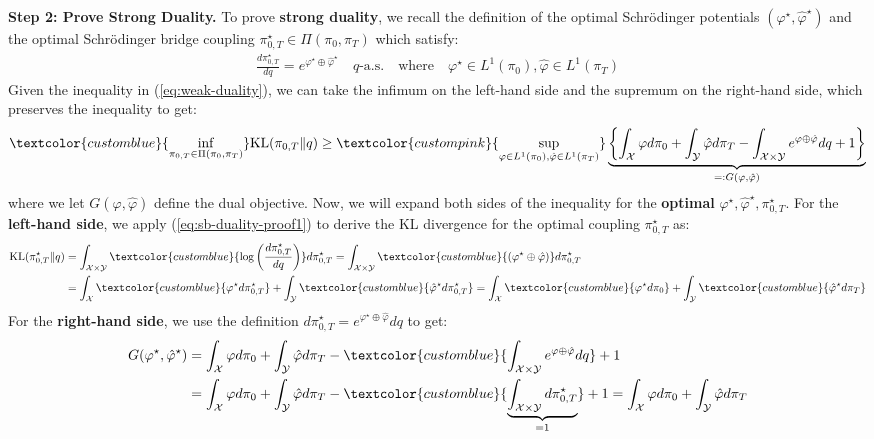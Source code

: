 \documentclass{article}
\newcommand{\boldtext}[1]{\textbf{\textcolor{MyGreen}{#1}}}
\newcommand{\bluetext}[1]{\textcolor{customblue}{#1}}
\newcommand{\pinktext}[1]{\textcolor{custompink}{#1}}
\begin{document}
\textbf{Step 2: Prove Strong Duality. }
To prove \boldtext{strong duality}, we recall the definition of the optimal Schrödinger potentials $(\varphi^\star, \hat{\varphi}^\star)$ and the optimal Schrödinger bridge coupling $\pi^\star_{0,T}\in \Pi(\pi_0, \pi_T)$ which satisfy:
\begin{align}
    \frac{d\pi^\star_{0,T}}{dq}=e^{\varphi^\star \oplus \hat{\varphi}^\star}\quad q\text{-a.s.}\quad \text{where}\quad \varphi^\star\in L^1(\pi_0), \hat{\varphi}\in L^1(\pi_T)\label{eq:sb-duality-proof1}
\end{align}
Given the inequality in (\ref{eq:weak-duality}), we can take the infimum on the left-hand side and the supremum on the right-hand side, which preserves the inequality to get:
\begin{align}
    \bluetext{\inf_{\pi_{0,T}\in\Pi(\pi_0, \pi_T)}}\text{KL}(\pi_{0,T}\|q)\geq\pinktext{\sup_{\varphi\in L^1(\pi_0), \hat{\varphi}\in L^1(\pi_T)}}\underbrace{\left\{\int_{\mathcal{X}}\varphi d\pi_0+\int_{\mathcal{Y}}\hat{\varphi}d\pi_T-\int_{\mathcal{X}\times \mathcal{Y}}e^{\varphi\oplus\hat{\varphi}}dq+1\right\}}_{=:G(\varphi, \hat{\varphi})}
\end{align}
where we let $G(\varphi, \hat{\varphi})$ define the dual objective. Now, we will expand both sides of the inequality for the \textbf{optimal} $\varphi^\star, \hat{\varphi}^\star, \pi^\star_{0,T}$. For the \textbf{left-hand side}, we apply (\ref{eq:sb-duality-proof1}) to derive the KL divergence for the optimal coupling $\pi^\star_{0,T}$ as: 
\begin{align}
    \text{KL}(\pi^\star_{0,T}\|q)&=\int_{\mathcal{X}\times \mathcal{Y}}\bluetext{\log \left(\frac{d\pi^\star_{0,T}}{dq}\right)}d\pi_{0,T}^\star=\int_{\mathcal{X}\times\mathcal{Y}}\bluetext{(\varphi^\star\oplus\hat{\varphi})}d\pi^\star_{0,T}\nonumber\\
    &=\int_{\mathcal{X}}\bluetext{\varphi^\star d\pi^\star_{0,T}}+\int_{\mathcal{Y}}\bluetext{\hat{\varphi}^\star d\pi^\star_{0,T}}=\int_{\mathcal{X}}\bluetext{\varphi^\star d\pi_0}+\int_{\mathcal{Y}}\bluetext{\hat{\varphi}^\star d\pi_T}\label{eq:sb-duality-proof2}
\end{align}
For the \textbf{right-hand side}, we use the definition $d\pi^\star_{0,T}=e^{\varphi^\star\oplus\hat{\varphi}}dq$ to get:
\begin{align}
    G(\varphi^\star, \hat{\varphi}^\star)&=\int_{\mathcal{X}}\varphi d\pi_0+\int_{\mathcal{Y}}\hat{\varphi}d\pi_T-\bluetext{\int_{\mathcal{X}\times \mathcal{Y}}e^{\varphi\oplus\hat{\varphi}}dq}+1\nonumber\\
    &=\int_{\mathcal{X}}\varphi d\pi_0+\int_{\mathcal{Y}}\hat{\varphi}d\pi_T-\bluetext{\underbrace{\int_{\mathcal{X}\times \mathcal{Y}}d\pi_{0,T}^\star}_{=1}}+1=\int_{\mathcal{X}}\varphi d\pi_0+\int_{\mathcal{Y}}\hat{\varphi}d\pi_T\label{eq:sb-duality-proof3}
\end{align}
\end{document}
